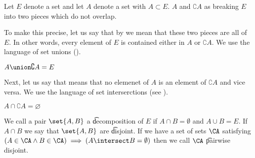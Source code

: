 

Let $E$ denote a set and let $A$ denote a set with $A \subset E$.
$A$ and $\complement{A}$ as breaking $E$ into two pieces which do not overlap.


To make this precise, let us say that by  we mean that these two pieces are all of $E$.
In other words, every element of $E$ is contained either in $A$ or $\complement{A}$.
We use the language of set unions ().

\begin{proposition}[Breaking]
  $A \union \complement{A} = E$
\end{proposition}

Next, let us say that  means that no elemenet of $A$ is an element of $\complement{A}$ and vice versa.
We use the language of set interserctions (see ).

\begin{proposition}
  $A \cap \complement{A} = \varnothing$
\end{proposition}


We call a pair $\set{A, B}$ a \t{decomposition} of $E$ if $A \cap B = \emptyset$ and $A \cup B = E$.
If $A \cap B$ we say that $\set{A, B}$ are \t{disjoint}.
If we have a set of sets $\CA$ satisfying $(A \in \CA \land B \in \CA) \implies (A \intersect B = \emptyset)$ then we call $\CA$ \t{pairwise disjoint}.

\blankpage
